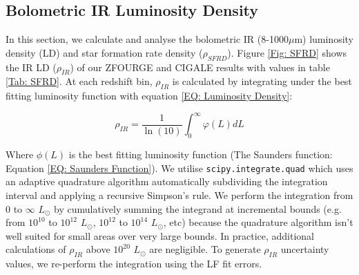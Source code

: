 \subsection{Bolometric IR Luminosity Density} \label{Sec: IR Density}
In this section, we calculate and analyse the bolometric IR (8-1000$\mu$m) luminosity density (LD) and star formation rate density ($\rho_{SFRD}$). Figure \ref{Fig: SFRD} shows the IR LD ($\rho_{IR}$) of our ZFOURGE and CIGALE results with values in table \ref{Tab: SFRD}. At each redshift bin, $\rho_{IR}$ is calculated by integrating under the best fitting luminosity function with equation \ref{EQ: Luminosity Density}:

\begin{equation} 
    \rho_{IR} = \frac{1}{\ln(10)} \int_{0}^{\infty} \varphi(L) dL 
    \label{EQ: Luminosity Density}
\end{equation}

Where $\phi(L)$ is the best fitting luminosity function (The Saunders function: Equation \ref{EQ: Saunders Function}). We utilise \texttt{scipy.integrate.quad} \citep{virtanen_scipy_2020} which uses an adaptive quadrature algorithm automatically subdividing the integration interval and applying a recursive Simpson’s rule. We perform the integration from $0$ to $\infty$ $L_{\odot}$ by cumulatively summing the integrand at incremental bounds (e.g. from $10^{10}$ to $10^{12}$ $L_{\odot}$, $10^{12}$ to $10^{14}$ $L_{\odot}$, etc) because the quadrature algorithm isn't well suited for small areas over very large bounds. In practice, additional calculations of $\rho_{IR}$ above $10^{20}$ $L_{\odot}$ are negligible. To generate $\rho_{IR}$ uncertainty values, we re-perform the integration using the LF fit errors.

